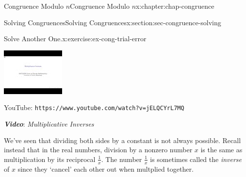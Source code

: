 \documentclass[oneside,10pt,]{book}
\newcommand{\mono}[1]{\texttt{#1}}
\newcommand{\alert}[1]{\textbf{\textit{#1}}}
\numberwithin{equation}{section}
\newlength{\qrsize}
\newlength{\previewwidth}
\begin{document}
\begin{chapterptx}{Congruence Modulo \(n\)}{}{Congruence Modulo \(n\)}{}{}{x:chapter:chap-congruence}
\begin{sectionptx}{Solving Congruences}{}{Solving Congruences}{}{}{x:section:sec-congruence-solving}
\begin{inlineexercise}{Solve Another One.}{x:exercise:ex-cong-trial-error}
\end{inlineexercise}%
\begin{sidebyside}{1}{0}{0}{0}%
\begin{sbspanel}{1}%
\setlength{\qrsize}{9em}
\setlength{\previewwidth}{\linewidth}
\addtolength{\previewwidth}{-\qrsize}
\begin{tcbraster}[raster columns=2, raster column skip=1pt, raster halign=center, raster force size=false, raster left skip=0pt, raster right skip=0pt]%
\begin{tcolorbox}[previewstyle, width=\previewwidth]%
\includegraphics[width=0.80\linewidth,height=\qrsize,keepaspectratio]{images/video-multiplicative-inverses.jpg}%
\end{tcolorbox}%
\begin{tcolorbox}[qrstyle]%
{\hypersetup{urlcolor=black}}%
\end{tcolorbox}%
\begin{tcolorbox}[captionstyle]%
\small YouTube: \mono{https://www.youtube.com/watch?v=jELQCYrL7MQ}\end{tcolorbox}%
\end{tcbraster}%
\end{sbspanel}%
\end{sidebyside}%
\par
\alert{Video}: \emph{Multiplicative Inverses}%
\par
We've seen that dividing both sides by a constant is not always possible. Recall instead that in the real numbers, division by a nonzero number \(x\) is the same as multiplication by its reciprocal \(\frac{1}{x}\). The number \(\frac{1}{x}\) is sometimes called the \emph{inverse} of \(x\) since they `cancel' each other out when multplied together.%
\par

\end{sectionptx}
\end{chapterptx}
\end{document}
